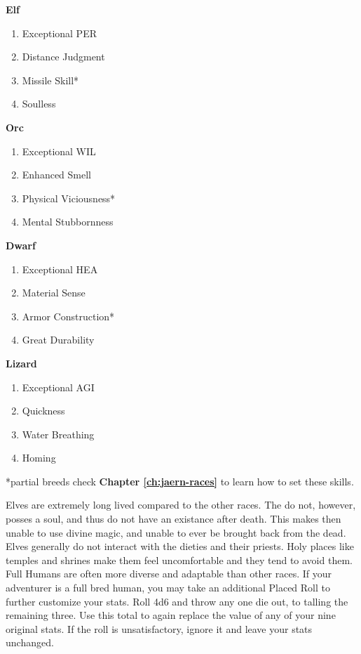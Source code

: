 \begin{multicols}{2}
\begin{multicols}{2}
\textbf{Elf}
\begin{enumerate}
\item Exceptional PER
\item Distance Judgment
\item Missile Skill*
\item Soulless
\end{enumerate}
\textbf{Orc}
\begin{enumerate}
\item Exceptional WIL
\item Enhanced Smell
\item Physical Viciousness*
\item Mental Stubbornness
\end{enumerate}
\textbf{Dwarf}
\begin{enumerate}
\item Exceptional HEA
\item Material Sense
\item Armor Construction*
\item Great Durability
\end{enumerate}
\textbf{Lizard}
\begin{enumerate}
\item Exceptional AGI
\item Quickness
\item Water Breathing
\item Homing
\end{enumerate}
\end{multicols}

*partial breeds check \textbf{Chapter \ref{ch:jaern-races}} to learn how to set these skills.

Elves are extremely long lived compared to the other races. The do not, however, posses a soul, and thus do not have an existance after death. This makes then unable to use divine magic, and unable to ever be brought back from the dead. Elves generally do not interact with the dieties and their priests. Holy places like temples and shrines make them feel uncomfortable and they tend to avoid them.\\
Full Humans are often more diverse and adaptable than other races. If your adventurer is a full bred human, you may take an additional Placed Roll to further customize your stats. Roll 4d6 and throw any one die out, to talling the remaining three. Use this total to again replace the value of any of your nine original stats. If the roll is unsatisfactory, ignore it and leave your stats unchanged.

\end{multicols}
